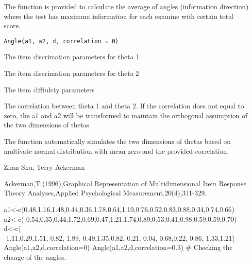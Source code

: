 \begin{Description}\relax
The function is provided to calculate the average of angles (information direction) where the test has maximum information for each examine with certain total score.
\end{Description}
\begin{Usage}
\begin{verbatim}
Angle(a1, a2, d, correlation = 0)
\end{verbatim}
\end{Usage}
\begin{Arguments}
\begin{ldescription}
\item[\code{a1}] The item discrimation parameters for theta 1 
\item[\code{a2}] The item discrimation parameters for theta 2
\item[\code{d}] The item diffiulcty parameters 
\item[\code{correlation}] The correlation between theta 1 and theta 2. If the correlation does not equal to zero, the a1 and a2 will be transformed to maintain the orthogonal assumption of the two dimensions of thetas 
\end{ldescription}
\end{Arguments}
\begin{Details}\relax
The function automatically simulates the two dimensions of thetas based on multivate normal distribution with mean zero and the provided correlation.
\end{Details}
\begin{Author}\relax
Zhan Shu, Terry Ackerman
\end{Author}
\begin{References}\relax
Ackerman,T.(1996),Graphical Representation of Multidimensional Item Response Theory Analyses,Applied Psychological Measurement,20(4),311-329.
\end{References}
\begin{Examples}
\begin{ExampleCode}
a1<-c(0.48,1.16,1.48,0.44,0.36,1.78,0.64,1.10,0.76,0.52,0.83,0.88,0.34,0.74,0.66)
a2<-c( 0.54,0.35,0.44,1.72,0.69,0.47,1.21,1.74,0.89,0.53,0.41,0.98,0.59,0.59,0.70)
d<-c( -1.11,0.29,1.51,-0.82,-1.89,-0.49,1.35,0.82,-0.21,-0.04,-0.68,0.22,-0.86,-1.33,1.21)
Angle(a1,a2,d,correlation=0)
Angle(a1,a2,d,correlation=0.3) # Checking the change of the angles.
\end{ExampleCode}
\end{Examples}

